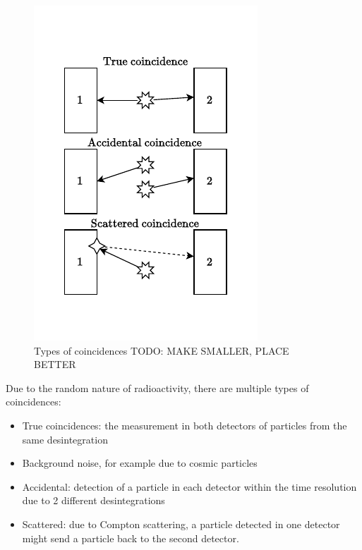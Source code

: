 \begin{figure}
    \includegraphics[width=\linewidth]{figures/coincidence_types.pdf}
    \caption{Types of coincidences TODO: MAKE SMALLER, PLACE BETTER}
\end{figure}
Due to the random nature of radioactivity, there are multiple types of coincidences:
\begin{itemize}
    \item True coincidences: the measurement in both detectors of particles from the same desintegration
    \item Background noise, for example due to cosmic particles
    \item Accidental: detection of a particle in each detector within the time resolution due to 2 different desintegrations
    \item Scattered: due to Compton scattering, a particle detected in one detector might send a particle back to the second detector.
\end{itemize}

